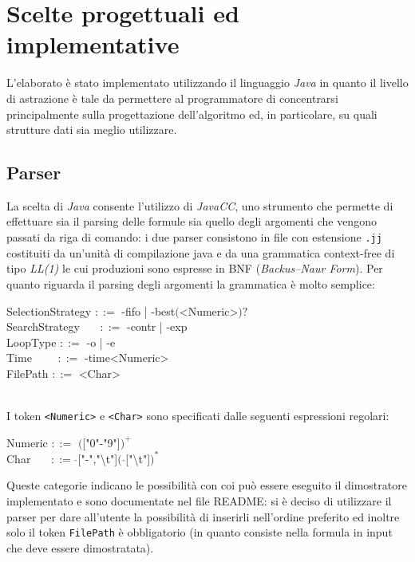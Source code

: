 \documentclass[a4paper,11pt]{article}
\newcommand{\grammarindent}[1][1]{\hspace*{#1\parindent}\ignorespaces}
\begin{document}
\section{Scelte progettuali ed implementative}
L'elaborato è stato implementato utilizzando il linguaggio \emph{Java} in quanto il livello di astrazione è tale da permettere al programmatore di concentrarsi principalmente sulla progettazione dell'algoritmo ed, in particolare, su quali strutture dati sia meglio utilizzare. 
\subsection{Parser}
La scelta di \emph{Java} consente l'utilizzo di \emph{JavaCC}, uno strumento che permette di effettuare sia il parsing delle formule sia quello degli argomenti che vengono passati da riga di comando: i due parser consistono in file con estensione \texttt{.jj} costituiti da un'unità di compilazione java e da una grammatica context-free di tipo \emph{LL(1)} le cui produzioni sono espresse in BNF (\emph{Backus–Naur Form}).
Per quanto riguarda il parsing degli argomenti la grammatica è molto semplice:
\\[1mm]
\begin{ttfamily}
\grammarindent SelectionStrategy $::=$  -fifo | -best$($<Numeric>$)?$ \\
\grammarindent SearchStrategy ~~~$::=$  -contr | -exp \\
\grammarindent LoopType $::=$ 	-o | -e\\
\grammarindent Time ~~~~$::=$ 	-time<Numeric>\\
\grammarindent FilePath $::=$ <Char>\\
\\[1mm]
\end{ttfamily}
I token \texttt{<Numeric>} e \texttt{<Char>} sono specificati dalle 
seguenti espressioni regolari:\\[1mm]
\begin{ttfamily}
\grammarindent Numeric $::=$ $($["0"-"9"]$)^+$\\
\grammarindent Char~~~ $::=$ $\widehat{}$["-","\textbackslash t"]$($ $\widehat{}$["\textbackslash t"]$)^*$\\[1.5mm]
\end{ttfamily}
Queste categorie indicano le possibilità con coi può essere eseguito il dimostratore implementato e sono documentate nel file README: si è deciso di utilizzare il parser per dare all'utente la possibilità di inserirli nell'ordine preferito ed inoltre solo il token \texttt{FilePath} è obbligatorio (in quanto consiste nella formula in input che deve essere dimostratata).
\end{document}
